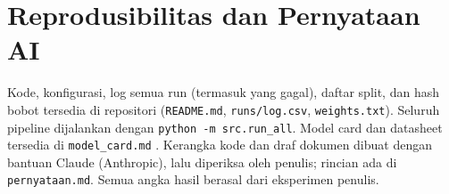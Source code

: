 \documentclass[conference]{IEEEtran}
\begin{document}
\section*{Reprodusibilitas dan Pernyataan AI}
Kode, konfigurasi, log semua run (termasuk yang gagal), daftar split, dan hash bobot tersedia di repositori (\texttt{README.md}, \texttt{runs/log.csv}, \texttt{weights.txt}). Seluruh pipeline dijalankan dengan \texttt{python -m src.run\_all}. Model card dan datasheet tersedia di \texttt{model\_card.md} \cite{mitchell2019modelcards,gebru2021datasheets}. Kerangka kode dan draf dokumen dibuat dengan bantuan Claude (Anthropic), lalu diperiksa oleh penulis; rincian ada di \texttt{pernyataan.md}. Semua angka hasil berasal dari eksperimen penulis.



\end{document}
